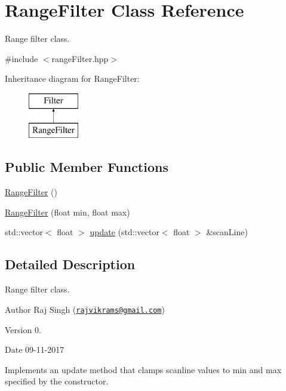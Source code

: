 \hypertarget{class_range_filter}{}\section{Range\+Filter Class Reference}
\label{class_range_filter}


Range filter class.  




{\ttfamily \#include $<$range\+Filter.\+hpp$>$}

Inheritance diagram for Range\+Filter\+:\begin{figure}[H]
\begin{center}
\leavevmode
\includegraphics[height=2.000000cm]{class_range_filter}
\end{center}
\end{figure}
\subsection*{Public Member Functions}
\begin{DoxyCompactItemize}
\item 
\hyperlink{class_range_filter_ad0b28929ddfb283eb0101b00726d1729}{Range\+Filter} ()
\item 
\hyperlink{class_range_filter_afed8c9dea5d2c7857075bfd1f64648a4}{Range\+Filter} (float min, float max)
\item 
std\+::vector$<$ float $>$ \hyperlink{class_range_filter_a6160f4ffe6788fb7fe935110ad941568}{update} (std\+::vector$<$ float $>$ \&scan\+Line)
\end{DoxyCompactItemize}


\subsection{Detailed Description}
Range filter class. 

\begin{DoxyAuthor}{Author}
Raj Singh (\href{mailto:rajvikrams@gmail.com}{\tt rajvikrams@gmail.\+com}) 
\end{DoxyAuthor}
\begin{DoxyVersion}{Version}
0. 
\end{DoxyVersion}
\begin{DoxyDate}{Date}
09-\/11-\/2017
\end{DoxyDate}
Implements an update method that clamps scanline values to min and max specified by the constructor. 

